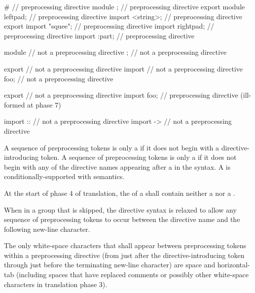 \begin{example}
\begin{codeblock}
#                       // preprocessing directive
module ;                // preprocessing directive
export module leftpad;  // preprocessing directive
import <string>;        // preprocessing directive
export import "squee";  // preprocessing directive
import rightpad;        // preprocessing directive
import :part;           // preprocessing directive

module                  // not a preprocessing directive
;                       // not a preprocessing directive

export                  // not a preprocessing directive
import                  // not a preprocessing directive
foo;                    // not a preprocessing directive

export                  // not a preprocessing directive
import foo;             // preprocessing directive (ill-formed at phase 7)

import ::               // not a preprocessing directive
import ->               // not a preprocessing directive
\end{codeblock}
\end{example}

\pnum
A sequence of preprocessing tokens is only a 
if it does not begin with a directive-introducing token.
A sequence of preprocessing tokens is only a 
if it does not begin with any of the directive names
appearing after a \tcode{\#} in the syntax.
A  is
conditionally-supported with
semantics.

\pnum
At the start of phase 4 of translation,
the  of a  shall
contain neither a  nor a .

\pnum
When in a group that is skipped, the directive
syntax is relaxed to allow any sequence of preprocessing tokens to occur between
the directive name and the following new-line character.

\pnum
The only white-space characters that shall appear
between preprocessing tokens
within a preprocessing directive
(from just after the directive-introducing token
through just before the terminating new-line character)
are space and horizontal-tab
(including spaces that have replaced comments
or possibly other white-space characters
in translation phase 3).

